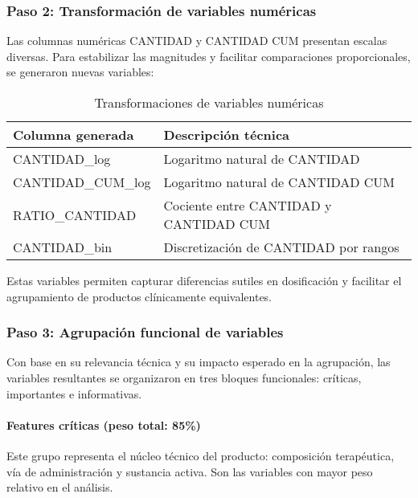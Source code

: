 \documentclass[conference]{IEEEtran}
\begin{document}
\subsubsection{Paso 2: Transformación de variables numéricas}

Las columnas numéricas CANTIDAD y CANTIDAD CUM presentan escalas diversas. Para estabilizar las magnitudes y facilitar comparaciones proporcionales, se generaron nuevas variables:

\begin{table}[h]
\caption{Transformaciones de variables numéricas}
\centering
\scriptsize
\begin{tabular}{|p{2.5cm}|p{4cm}|}
\hline
\textbf{Columna generada} & \textbf{Descripción técnica} \\
\hline
CANTIDAD\_log & Logaritmo natural de CANTIDAD \\
\hline
CANTIDAD\_CUM\_log & Logaritmo natural de CANTIDAD CUM \\
\hline
RATIO\_CANTIDAD & Cociente entre CANTIDAD y CANTIDAD CUM \\
\hline
CANTIDAD\_bin & Discretización de CANTIDAD por rangos \\
\hline
\end{tabular}
\end{table}

Estas variables permiten capturar diferencias sutiles en dosificación y facilitar el agrupamiento de productos clínicamente equivalentes.

\subsubsection{Paso 3: Agrupación funcional de variables}

Con base en su relevancia técnica y su impacto esperado en la agrupación, las variables resultantes se organizaron en tres bloques funcionales: críticas, importantes e informativas.

\paragraph{Features críticas (peso total: 85\%)}

Este grupo representa el núcleo técnico del producto: composición terapéutica, vía de administración y sustancia activa. Son las variables con mayor peso relativo en el análisis.
\end{document}
